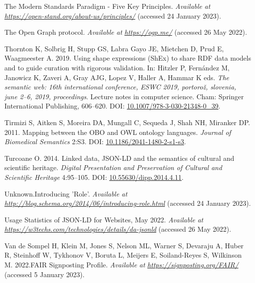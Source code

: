 \begin{CSLReferences}{1}{0}
\leavevmode{}%
The Modern Standards Paradigm - Five Key Principles. \emph{Available at} \href{https://open-stand.org/about-us/principles/}{\emph{https://open-stand.org/about-us/principles/}} (accessed 24 January 2023).

\leavevmode{}%
The Open Graph protocol. \emph{Available at} \href{https://ogp.me/}{\emph{https://ogp.me/}} (accessed 26 May 2022).

\leavevmode{}%
Thornton K, Solbrig H, Stupp GS, Labra Gayo JE, Mietchen D, Prud E, Waagmeester A. 2019. Using shape expressions (ShEx) to share RDF data models and to guide curation with rigorous validation. In: Hitzler P, Fernández M, Janowicz K, Zaveri A, Gray AJG, Lopez V, Haller A, Hammar K eds. \emph{The semantic web: 16th international conference, ESWC 2019, portorož, slovenia, june 2--6, 2019, proceedings}. Lecture notes in computer science. Cham: Springer International Publishing, 606--620. DOI: \href{https://doi.org/10.1007/978-3-030-21348-0_39}{10.1007/978-3-030-21348-0\_39}.

\leavevmode{}%
Tirmizi S, Aitken S, Moreira DA, Mungall C, Sequeda J, Shah NH, Miranker DP. 2011. Mapping between the OBO and OWL ontology languages. \emph{Journal of Biomedical Semantics} 2:S3. DOI: \href{https://doi.org/10.1186/2041-1480-2-s1-s3}{10.1186/2041-1480-2-s1-s3}.

\leavevmode{}%
Turcoane O. 2014. Linked data, JSON-LD and the semantics of cultural and scientific heritage. \emph{Digital Presentation and Preservation of Cultural and Scientific Heritage} 4:95--105. DOI: \href{https://doi.org/10.55630/dipp.2014.4.11}{10.55630/dipp.2014.4.11}.

\leavevmode{}%
Unknown.Introducing 'Role'. \emph{Available at} \href{http://blog.schema.org/2014/06/introducing-role.html}{\emph{http://blog.schema.org/2014/06/introducing-role.html}} (accessed 24 January 2023).

\leavevmode{}%
Usage Statistics of JSON-LD for Websites, May 2022. \emph{Available at} \href{https://w3techs.com/technologies/details/da-jsonld}{\emph{https://w3techs.com/technologies/details/da-jsonld}} (accessed 26 May 2022).

\leavevmode{}%
Van de Sompel H, Klein M, Jones S, Nelson ML, Warner S, Devaraju A, Huber R, Steinhoff W, Tykhonov V, Boruta L, Meijers E, Soiland-Reyes S, Wilkinson M. 2022.FAIR Signposting Profile. \emph{Available at} \href{https://signposting.org/FAIR/}{\emph{https://signposting.org/FAIR/}} (accessed 5 January 2023).


\end{CSLReferences}
